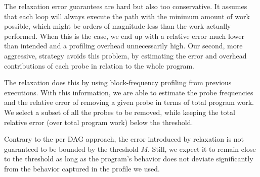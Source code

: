     The \WCRelaxLower relaxation error guarantees are hard but also too conservative. It assumes that each loop will always execute the
    path with the minimum amount of work possible, which might be orders of magnitude less than the work actually performed. When this is
    the case, we end up with a relative error much lower than intended and a profiling overhead unnecessarily high. Our second, more
    aggressive, strategy avoids this problem, by estimating the error and overhead contributions of each probe in relation to the whole
    program. 

    The \WPRelaxLower relaxation does this by using block-frequency profiling from previous executions. With this information, we are able
    to estimate the probe frequencies and the relative error of removing a given probe in terms of total program work. We select a subset
    of all the probes to be removed, while keeping the total relative error (over total program work) below the threshold.
    
    Contrary to the per DAG approach, the error introduced by \WPRelaxLower relaxation is not guaranteed to be bounded by the threshold
    $M$. Still, we expect it to remain close to the threshold as long as the program's behavior does not deviate significantly from the
    behavior captured in the profile we used.
